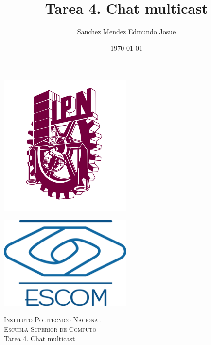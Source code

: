\documentclass[11pt]{article}
\date{\today}
\title{Tarea 4. Chat multicast}
\author{Sanchez Mendez Edmundo Josue}
\begin{document}
		\begin{titlepage}
			\begin{center}
				
				
				\noindent
				\begin{minipage}{0.5\textwidth}
					\begin{flushleft} \large
						\includegraphics[width=0.5\textwidth]{resources/ipn.png}
					\end{flushleft}
				\end{minipage}%
				\begin{minipage}{0.55\textwidth}
					\begin{flushright} \large
						\includegraphics[width=0.5\textwidth]{resources/escom.png}
					\end{flushright}
				\end{minipage}
				
				\textsc{\LARGE Instituto Politécnico Nacional}\\[0.5cm]
				
				\textsc{\Large Escuela Superior de Cómputo}\\[1cm]
				
				
				{ \huge Tarea 4. Chat multicast \\[1cm] }
				

\end{center}
\end{titlepage}
\end{document}
